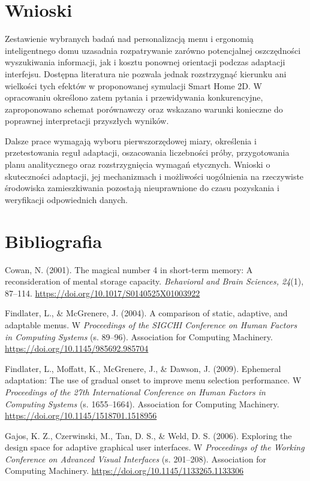 \documentclass[11pt,a4paper]{article}
\begin{document}
\section{Wnioski}

Zestawienie wybranych badań nad personalizacją menu i ergonomią inteligentnego domu uzasadnia rozpatrywanie zarówno potencjalnej oszczędności wyszukiwania informacji, jak i kosztu ponownej orientacji podczas adaptacji interfejsu. Dostępna literatura nie pozwala jednak rozstrzygnąć kierunku ani wielkości tych efektów w proponowanej symulacji Smart Home 2D. W opracowaniu określono zatem pytania i przewidywania konkurencyjne, zaproponowano schemat porównawczy oraz wskazano warunki konieczne do poprawnej interpretacji przyszłych wyników.

Dalsze prace wymagają wyboru pierwszorzędowej miary, określenia i przetestowania reguł adaptacji, oszacowania liczebności próby, przygotowania planu analitycznego oraz rozstrzygnięcia wymagań etycznych. Wnioski o skuteczności adaptacji, jej mechanizmach i możliwości uogólnienia na rzeczywiste środowiska zamieszkiwania pozostają nieuprawnione do czasu pozyskania i weryfikacji odpowiednich danych.

\section*{Bibliografia}

Cowan, N. (2001). The magical number 4 in short-term memory: A reconsideration of mental storage capacity. \textit{Behavioral and Brain Sciences, 24}(1), 87--114. \url{https://doi.org/10.1017/S0140525X01003922}

Findlater, L., \& McGrenere, J. (2004). A comparison of static, adaptive, and adaptable menus. W \textit{Proceedings of the SIGCHI Conference on Human Factors in Computing Systems} (s. 89--96). Association for Computing Machinery. \url{https://doi.org/10.1145/985692.985704}

Findlater, L., Moffatt, K., McGrenere, J., \& Dawson, J. (2009). Ephemeral adaptation: The use of gradual onset to improve menu selection performance. W \textit{Proceedings of the 27th International Conference on Human Factors in Computing Systems} (s. 1655--1664). Association for Computing Machinery. \url{https://doi.org/10.1145/1518701.1518956}

Gajos, K. Z., Czerwinski, M., Tan, D. S., \& Weld, D. S. (2006). Exploring the design space for adaptive graphical user interfaces. W \textit{Proceedings of the Working Conference on Advanced Visual Interfaces} (s. 201--208). Association for Computing Machinery. \url{https://doi.org/10.1145/1133265.1133306}
\end{document}
